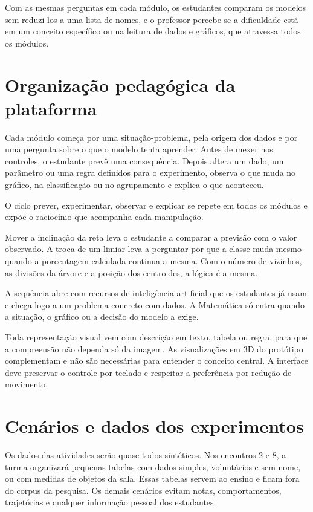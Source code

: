 Com as mesmas perguntas em cada módulo, os estudantes comparam os modelos sem reduzi-los a uma lista de nomes, e o professor percebe se a dificuldade está em um conceito específico ou na leitura de dados e gráficos, que atravessa todos os módulos.

\section{Organização pedagógica da plataforma}

Cada módulo começa por uma situação-problema, pela origem dos dados e por uma pergunta sobre o que o modelo tenta aprender. Antes de mexer nos controles, o estudante prevê uma consequência. Depois altera um dado, um parâmetro ou uma regra definidos para o experimento, observa o que muda no gráfico, na classificação ou no agrupamento e explica o que aconteceu.

O ciclo prever, experimentar, observar e explicar se repete em todos os módulos e expõe o raciocínio que acompanha cada manipulação.

Mover a inclinação da reta leva o estudante a comparar a previsão com o valor observado. A troca de um limiar leva a perguntar por que a classe muda mesmo quando a porcentagem calculada continua a mesma. Com o número de vizinhos, as divisões da árvore e a posição dos centroides, a lógica é a mesma.

A sequência abre com recursos de inteligência artificial que os estudantes já usam e chega logo a um problema concreto com dados. A Matemática só entra quando a situação, o gráfico ou a decisão do modelo a exige.

Toda representação visual vem com descrição em texto, tabela ou regra, para que a compreensão não dependa só da imagem. As visualizações em 3D do protótipo complementam e não são necessárias para entender o conceito central. A interface deve preservar o controle por teclado e respeitar a preferência por redução de movimento.

\section{Cenários e dados dos experimentos}

Os dados das atividades serão quase todos sintéticos. Nos encontros 2 e 8, a turma organizará pequenas tabelas com dados simples, voluntários e sem nome, ou com medidas de objetos da sala. Essas tabelas servem ao ensino e ficam fora do corpus da pesquisa. Os demais cenários evitam notas, comportamentos, trajetórias e qualquer informação pessoal dos estudantes.

